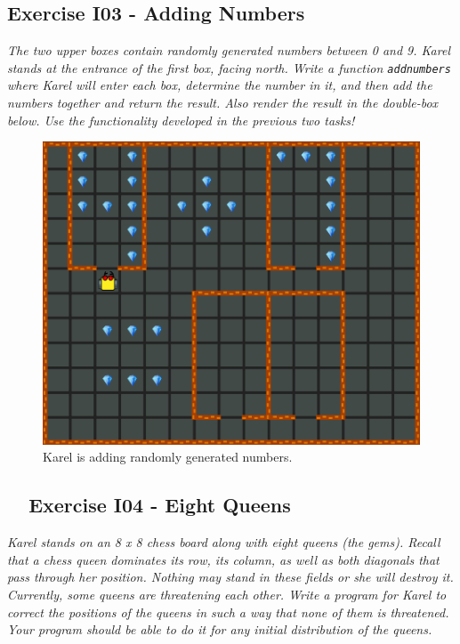 \documentclass[article,A4,12pt]{llncs}
\begin{document}
{{{{\subsection{Exercise I03 - Adding Numbers}

{\em The two upper boxes contain randomly generated numbers between 0 and 9. Karel stands at the entrance of the first box,
facing north. Write a function {\tt addnumbers} where Karel will enter each box, determine the number in it,
and then add the numbers together and return the result. Also render the result in the double-box below. 
Use the functionality developed in the previous two tasks!}\\[-7mm]


\begin{figure}[!ht]
\begin{center}
\includegraphics[height=0.4\textwidth]{img/i03.png}
\end{center}
\vspace{-4mm}
\caption{Karel is adding randomly generated numbers.}
\label{fig:g12}
\end{figure}
\noindent

\subsection{\ \ Exercise I04 - Eight Queens}

{\em Karel stands on an 8 x 8 chess board along with eight queens (the gems). Recall that a chess queen dominates its row, its column, as well as both diagonals that pass through her position. Nothing may stand in these fields or she will destroy it. Currently, some queens are threatening each other. Write a program for Karel to correct the positions of the queens in such a way that none of them is threatened. Your program should be able to do it for any initial distribution of the queens. }

}}}}
\end{document}
